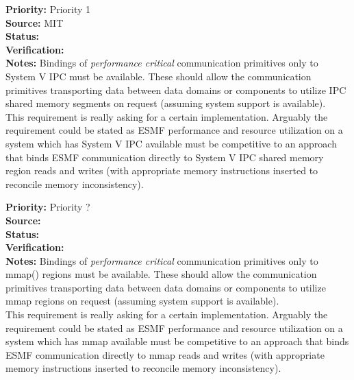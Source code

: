 \begin{reqlist}
{\bf Priority:} Priority 1 \\
{\bf Source:}  MIT \\
{\bf Status:}  \\
{\bf Verification:} \\
{\bf Notes:} Bindings of {\it performance critical} communication primitives only
to System V IPC must be available. These should allow the communication
primitives transporting data between data domains or components to
utilize IPC shared memory segments on request (assuming system support
is available). \\
This requirement is really asking for a certain implementation.
Arguably the requirement could be stated as ESMF performance
and resource utilization on a system which has System V IPC available must be
competitive to an approach that binds ESMF communication directly to System V IPC shared
memory region reads and writes (with appropriate memory
instructions inserted to reconcile memory inconsistency).
\end{reqlist}

\begin{reqlist}
{\bf Priority:} Priority ? \\
{\bf Source:}  \\
{\bf Status:}  \\
{\bf Verification:} \\
{\bf Notes:} Bindings of {\it performance critical} communication primitives only
to mmap() regions must be available. These should allow the communication
primitives transporting data between data domains or components to
utilize mmap regions on request (assuming system support
is available).\\
This requirement is really asking for a certain implementation.
Arguably the requirement could be stated as ESMF performance
and resource utilization on a system which has mmap available must be
competitive to an approach that binds ESMF communication directly to mmap
reads and writes (with appropriate memory
instructions inserted to reconcile memory inconsistency).
\end{reqlist}


